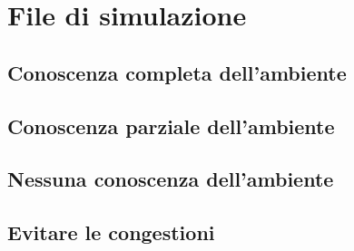 \documentclass[12pt,a4paper,openright,oneside]{book}
\begin{document}




\appendix
\chapter{File di simulazione}

\section{Conoscenza completa dell'ambiente}


\section{Conoscenza parziale dell'ambiente}


\section{Nessuna conoscenza dell'ambiente}


\section{Evitare le congestioni}

\end{document}
